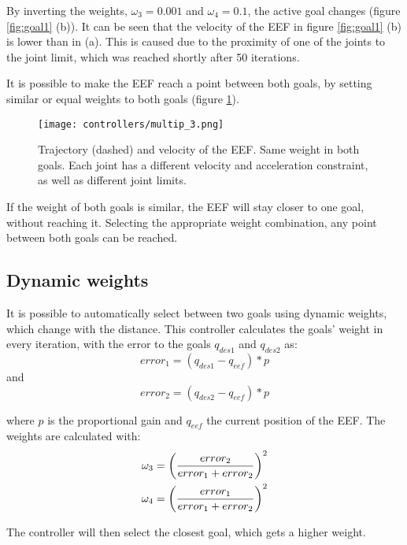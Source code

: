 By inverting the weights, $\omega_{3} = 0.001$ and $\omega_{4} = 0.1$, the active goal changes (figure \ref{fig:goal1} (b)). It can be seen that the velocity of the EEF in figure \ref{fig:goal1} (b) is lower than in (a). This is caused due to the proximity of one of the joints to the joint limit, which was reached shortly after 50 iterations.

It is possible to make the EEF reach a point between both goals, by setting similar or equal weights to both goals (figure \ref{fig:goal2}). 
\begin{figure}[H]
	\centering
	\texttt{[image: controllers/multip\_3.png]}
	\vspace{-10pt}
	\caption[Multiple goals: Middle point]{Trajectory (dashed) and velocity  of the EEF. Same weight in both goals. Each joint has a different velocity and acceleration constraint, as well as different joint limits.}
	\vspace{-15pt}
	\label{fig:goal2}
\end{figure}
If the weight of both goals is similar, the EEF will stay closer to one goal, without reaching it. Selecting the appropriate weight combination, any point between both goals can be reached.


\subsection{Dynamic weights}

It is possible to automatically select between two goals using dynamic weights, which change with the distance. This controller calculates the goals' weight in every iteration, with the error to the goals $q_{des1}$ and $q_{des2}$ as: 
$$error_1 = (q_{des1} - q_{eef})*p $$
and
$$error_2 = (q_{des2} - q_{eef})*p $$

where $p$ is the proportional gain and $q_{eef}$ the current position of the EEF. The weights are calculated with:
\begin{subequations}
	\begin{align}
		 \omega_3 = \left( \dfrac{error_2}{error_1 + error_2} \right) ^{2} \\
		 \omega_4 = \left( \dfrac{error_1}{error_1 + error_2} \right) ^{2}
	\end{align}
	\label{eq:dyn}
	\vspace{-10pt}
\end{subequations}

The controller will then select the closest goal, which gets a higher weight. 

